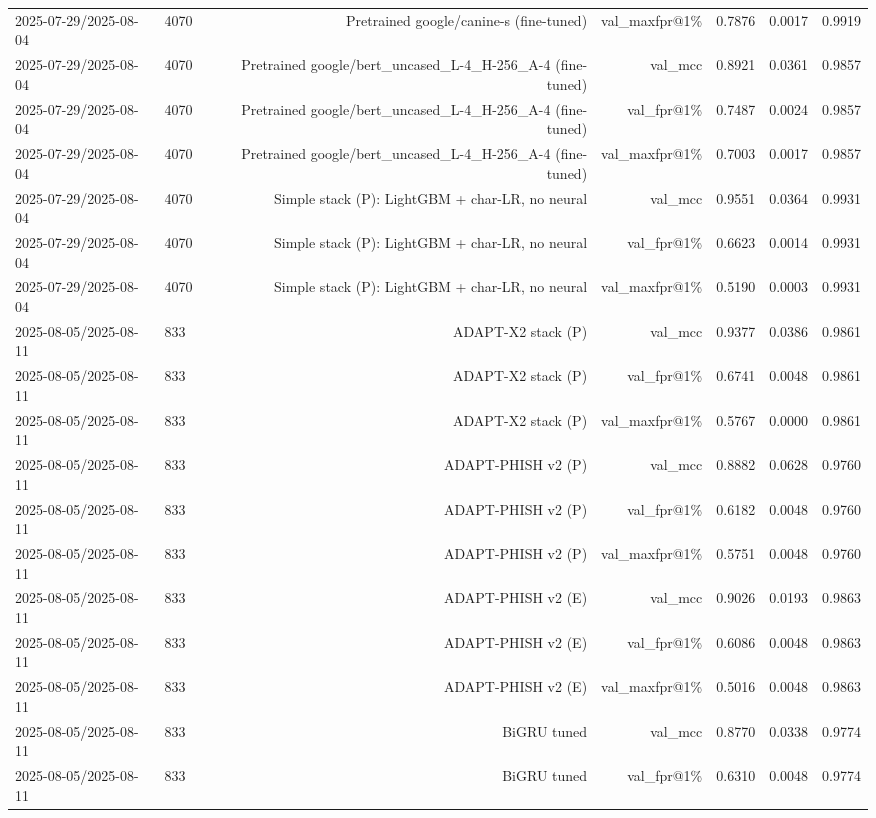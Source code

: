 \begin{table}[t]
\begin{tabular}{llrrrrr}
2025-07-29/2025-08-04 & 4070 & Pretrained google/canine-s (fine-tuned) & val\_maxfpr@1\% & 0.7876 & 0.0017 & 0.9919 \\
2025-07-29/2025-08-04 & 4070 & Pretrained google/bert\_uncased\_L-4\_H-256\_A-4 (fine-tuned) & val\_mcc & 0.8921 & 0.0361 & 0.9857 \\
2025-07-29/2025-08-04 & 4070 & Pretrained google/bert\_uncased\_L-4\_H-256\_A-4 (fine-tuned) & val\_fpr@1\% & 0.7487 & 0.0024 & 0.9857 \\
2025-07-29/2025-08-04 & 4070 & Pretrained google/bert\_uncased\_L-4\_H-256\_A-4 (fine-tuned) & val\_maxfpr@1\% & 0.7003 & 0.0017 & 0.9857 \\
2025-07-29/2025-08-04 & 4070 & Simple stack (P): LightGBM + char-LR, no neural & val\_mcc & 0.9551 & 0.0364 & 0.9931 \\
2025-07-29/2025-08-04 & 4070 & Simple stack (P): LightGBM + char-LR, no neural & val\_fpr@1\% & 0.6623 & 0.0014 & 0.9931 \\
2025-07-29/2025-08-04 & 4070 & Simple stack (P): LightGBM + char-LR, no neural & val\_maxfpr@1\% & 0.5190 & 0.0003 & 0.9931 \\
2025-08-05/2025-08-11 & 833 & ADAPT-X2 stack (P) & val\_mcc & 0.9377 & 0.0386 & 0.9861 \\
2025-08-05/2025-08-11 & 833 & ADAPT-X2 stack (P) & val\_fpr@1\% & 0.6741 & 0.0048 & 0.9861 \\
2025-08-05/2025-08-11 & 833 & ADAPT-X2 stack (P) & val\_maxfpr@1\% & 0.5767 & 0.0000 & 0.9861 \\
2025-08-05/2025-08-11 & 833 & ADAPT-PHISH v2 (P) & val\_mcc & 0.8882 & 0.0628 & 0.9760 \\
2025-08-05/2025-08-11 & 833 & ADAPT-PHISH v2 (P) & val\_fpr@1\% & 0.6182 & 0.0048 & 0.9760 \\
2025-08-05/2025-08-11 & 833 & ADAPT-PHISH v2 (P) & val\_maxfpr@1\% & 0.5751 & 0.0048 & 0.9760 \\
2025-08-05/2025-08-11 & 833 & ADAPT-PHISH v2 (E) & val\_mcc & 0.9026 & 0.0193 & 0.9863 \\
2025-08-05/2025-08-11 & 833 & ADAPT-PHISH v2 (E) & val\_fpr@1\% & 0.6086 & 0.0048 & 0.9863 \\
2025-08-05/2025-08-11 & 833 & ADAPT-PHISH v2 (E) & val\_maxfpr@1\% & 0.5016 & 0.0048 & 0.9863 \\
2025-08-05/2025-08-11 & 833 & BiGRU tuned & val\_mcc & 0.8770 & 0.0338 & 0.9774 \\
2025-08-05/2025-08-11 & 833 & BiGRU tuned & val\_fpr@1\% & 0.6310 & 0.0048 & 0.9774 \\

\end{tabular}
\end{table}
